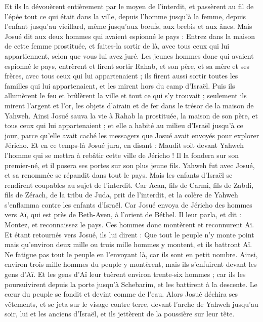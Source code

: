 \begin{multicols}{2}
Et ils la dévouèrent entièrement par le moyen de l'interdit, et passèrent au fil de l'épée tout ce qui était dans la ville, depuis l'homme jusqu'à la femme, depuis l'enfant jusqu'au vieillard, même jusqu'aux bœufs, aux brebis et aux ânes.
Mais Josué dit aux deux hommes qui avaient espionné le pays : Entrez dans la maison de cette femme prostituée, et faites-la sortir de là, avec tous ceux qui lui appartiennent, selon que vous lui avez juré.
Les jeunes hommes donc qui avaient espionné le pays, entrèrent et firent sortir Rahab, et son père, et sa mère et ses frères, avec tous ceux qui lui appartenaient ; ils firent aussi sortir toutes les familles qui lui appartenaient, et les mirent hors du camp d'Israël.
Puis ils allumèrent le feu et brûlèrent la ville et tout ce qui s'y trouvait ; seulement ils mirent l'argent et l'or, les objets d'airain et de fer dans le trésor de la maison de Yahweh.
Ainsi Josué sauva la vie à Rahab la prostituée, la maison de son père, et tous ceux qui lui appartenaient ; et elle a habité au milieu d'Israël jusqu'à ce jour, parce qu'elle avait caché les messagers que Josué avait envoyés pour explorer Jéricho.
Et en ce temps-là Josué jura, en disant : Maudit soit devant Yahweh l'homme qui se mettra à rebâtir cette ville de Jéricho ! Il la fondera sur son premier-né, et il posera ses portes sur son plus jeune fils.
Yahweh fut avec Josué, et sa renommée se répandit dans tout le pays.
\VerseOne{}Mais les enfants d'Israël se rendirent coupables au sujet de l'interdit. Car Acan, fils de Carmi, fils de Zabdi, fils de Zérach, de la tribu de Juda, prit de l'interdit, et la colère de Yahweh s'enflamma contre les enfants d'Israël.
Car Josué envoya de Jéricho des hommes vers Aï, qui est près de Beth-Aven, à l'orient de Béthel. Il leur parla, et dit : Montez, et reconnaissez le pays. Ces hommes donc montèrent et reconnurent Aï.
Et étant retournés vers Josué, ils lui dirent : Que tout le peuple n'y monte point mais qu'environ deux mille ou trois mille hommes y montent, et ils battront Aï. Ne fatigue pas tout le peuple en l'envoyant là, car ils sont en petit nombre.
Ainsi, environ trois mille hommes du peuple y montèrent, mais ils s'enfuirent devant les gens d'Aï.
Et les gens d'Aï leur tuèrent environ trente-six hommes ; car ils les poursuivirent depuis la porte jusqu'à Schebarim, et les battirent à la descente. Le cœur du peuple se fondit et devint comme de l'eau.
Alors Josué déchira ses vêtements, et se jeta sur le visage contre terre, devant l'arche de Yahweh jusqu'au soir, lui et les anciens d'Israël, et ils jettèrent de la poussière sur leur tête.

\end{multicols}
